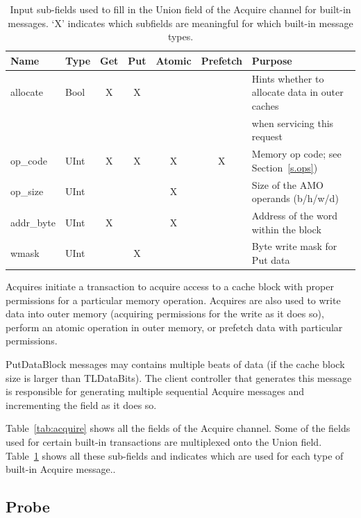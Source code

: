\begin{table}[h]
\begin{center}
\begin{tabular}{|l|l|c|c|c|c|l|}
    \hline
Name       & Type & Get & Put & Atomic & Prefetch & Purpose \\ \hline \hline
allocate   & Bool & X   & X   &        &          & Hints whether to allocate data in outer caches \\
           &      &     &     &        &          & when servicing this request \\ \hline
op\_code   & UInt & X   & X   & X      & X        & Memory op code; see Section~\ref{s.ops}) \\ \hline
op\_size   & UInt &     &     & X      &          & Size of the AMO operands (b/h/w/d) \\ \hline
addr\_byte & UInt & X   &     & X      &          & Address of the word within the block \\ \hline
wmask      & UInt &     & X   &        &          & Byte write mask for Put data \\ \hline
\end{tabular}
\end{center}
\caption{Input sub-fields used to fill in the Union field of the Acquire channel for built-in messages.
`X' indicates which  subfields are meaningful for which built-in message types.
}
\label{tab:union}
\end{table}

Acquires initiate a transaction to acquire access to a cache block with proper permissions for a particular memory operation.
Acquires are also used to write data into outer memory (acquiring permissions for the write as it does so), perform an atomic operation in outer memory, or prefetch data with particular permissions.

PutDataBlock messages may contains multiple beats of data (if the cache block size is larger than TLDataBits).
The client controller that generates this message is responsible for generating multiple sequential Acquire messages and incrementing the  field as it does so.

Table~\ref{tab:acquire} shows all the fields of the Acquire channel.
Some of the fields used for certain built-in transactions are multiplexed onto the Union field.
Table~\ref{tab:union} shows all these sub-fields and indicates which are used for each type
of built-in Acquire message..

\subsection{Probe}

